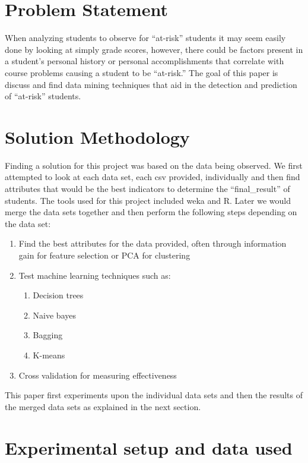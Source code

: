 \documentclass[12pt]{article}
\begin{document}
\section{Problem Statement}

When analyzing students to observe for ``at-risk'' students it may seem easily done by looking at simply grade scores, however, there could be factors
present in a student's personal history or personal accomplishments that correlate with course problems causing a student to be ``at-risk.'' The goal of this paper is discuss and find data mining techniques that aid in the detection and prediction of ``at-risk'' students.

\section{Solution Methodology}

Finding a solution for this project was based on the data being observed. We first attempted to look at each data set, each csv provided, individually and then find attributes that would be the best indicators to determine the ``final\_result'' of students. The tools used for this project included weka and R. Later we would merge the data sets together and then perform the following steps depending on the data set:

\begin{enumerate}
  \item Find the best attributes for the data provided, often through information gain for feature selection or PCA for clustering
  \item Test machine learning techniques such as:
  \begin{enumerate}
     \item Decision trees
     \item Naive bayes
     \item Bagging
     \item K-means
  \end{enumerate}
  \item Cross validation for measuring effectiveness
\end{enumerate}

This paper first experiments upon the individual data sets and then the results of the merged data sets as explained in the next section.

\section{Experimental setup and data used}
\end{document}
